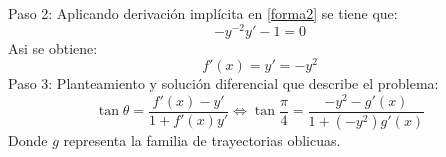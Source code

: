 \documentclass[12pt,letterpaper]{article}
\begin{document}
\begin{titlepage}
\begin{flushleft}
Paso 2: Aplicando derivación implícita en \eqref{forma2} se tiene que:
\begin{equation} \tag{3} \label{forma3}
-y^{-2}y' - 1 = 0 
\end{equation}
Asi se obtiene:
\begin{equation*} 
f'(x) = y' = -y^{2} 
\end{equation*}
Paso 3: Planteamiento y solución diferencial que describe el problema:
\begin{equation} \tag{4} \label{forma4}
\tan \theta = \frac{f'(x) - y'}{1+ f'(x)y'} \Leftrightarrow \tan \frac{\pi}{4} = \frac{ -y^{2} - g'(x)}{1+ (-y^{2})g'(x)}
\end{equation}
Donde $g$ representa la familia de trayectorias oblicuas.
\end{flushleft}
\end{titlepage}
\end{document}
